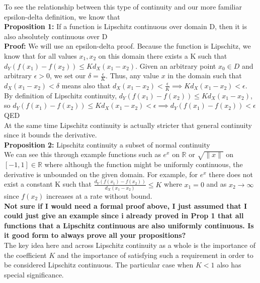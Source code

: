 \documentclass{article}
\begin{document}
To see the relationship between this type of continuity and our more familiar epsilon-delta definition, we know that\\

\textbf{Proposition 1: }If a function is Lipschitz continuous over domain D, then it is also absolutely continuous over D\\


\textbf{Proof:} We will use an epsilon-delta proof. Because the function is Lipschitz, we know that for all values $x_1, x_2$ on this domain there exists a K such that $d_Y(f(x_1)-f(x_2)) \leq Kd_X(x_1-x_2)$. Given an arbitrary point $x_0 \in D$ and arbitrary $\epsilon >0$, we set our $\delta = \frac{\epsilon}{K}$. Thus, any value $x$ in the domain such that $d_X(x_1-x_2)<\delta$ means also that $d_X(x_1-x_2)<\frac{\epsilon}{K} \implies Kd_X(x_1-x_2)<\epsilon$. By definition of Lipschitz continuity, $d_Y(f(x_1)-f(x_2)) \leq Kd_X(x_1-x_2)$, so $d_Y(f(x_1)-f(x_2)) \leq Kd_X(x_1-x_2) < \epsilon \implies d_Y(f(x_1)-f(x_2))< \epsilon$
QED\\

At the same time Lipschitz continuity is actually stricter that general continuity since it bounds the derivative. \\

\textbf{Proposition 2:} Lipschitz continuity a subset of normal continuity \\

We can see this through example functions such as $e^x$ on $\mathbb{R}$ or $\sqrt{\|x\|}$ on $[-1,1] \in \mathbb{R}$ where although the function might be uniformly continuous, the derivative is unbounded on the given domain. For example, for $e^x$ there does not exist a constant K such that $\frac{d_Y(f(x_1)-f(x_2))}{d_X(x_1 - x_2)} \leq K$ where $x_1 = 0$ and as $x_2 \to \infty$ since $f(x_2)$ increases at a rate without bound. \\

\textbf{Not sure if I would need a formal proof above, I just assumed that I could just give an example since i already proved in Prop 1 that all functions that a Lipschitz continuous are also uniformly continuous. Is it good form to always prove all your propositions?} \\

The key idea here and across Lipschitz continuity as a whole is the importance of the coefficient $K$ and the importance of satisfying such a requirement in order to be considered Lipschitz continuous. The particular case when $K < 1$ also has special significance. \\
\end{document}
